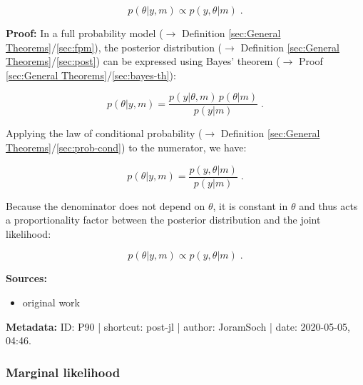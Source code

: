 \documentclass[a4paper,12pt,twoside]{book}
\begin{document}
\begin{equation} \label{eq:post-jl-post}
p(\theta|y,m) \propto p(y,\theta|m) \; .
\end{equation}


\vspace{1em}
\textbf{Proof:} In a full probability model ($\rightarrow$ Definition \ref{sec:General Theorems}/\ref{sec:fpm}), the posterior distribution ($\rightarrow$ Definition \ref{sec:General Theorems}/\ref{sec:post}) can be expressed using Bayes' theorem ($\rightarrow$ Proof \ref{sec:General Theorems}/\ref{sec:bayes-th}):

\begin{equation} \label{eq:post-jl-post-s1}
p(\theta|y,m) = \frac{p(y|\theta,m) \, p(\theta|m)}{p(y|m)} \; .
\end{equation}

Applying the law of conditional probability ($\rightarrow$ Definition \ref{sec:General Theorems}/\ref{sec:prob-cond}) to the numerator, we have:

\begin{equation} \label{eq:post-jl-post-s2}
p(\theta|y,m) = \frac{p(y,\theta|m)}{p(y|m)} \; .
\end{equation}

Because the denominator does not depend on $\theta$, it is constant in $\theta$ and thus acts a proportionality factor between the posterior distribution and the joint likelihood:

\begin{equation} \label{eq:post-jl-post-qed}
p(\theta|y,m) \propto p(y,\theta|m) \; .
\end{equation}


\vspace{1em}
\textbf{Sources:}
\begin{itemize}
\item original work\end{itemize}


\vspace{1em}
\textbf{Metadata:} ID: P90 | shortcut: post-jl | author: JoramSoch | date: 2020-05-05, 04:46.
\vspace{1em}



\subsubsection[\textit{Marginal likelihood}]{Marginal likelihood} \label{sec:ml}
\setcounter{equation}{0}
\end{document}
